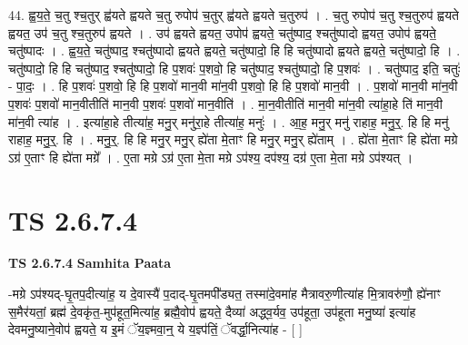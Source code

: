 \documentclass[17pt]{extarticle}
\begin{document}
44. ह्व॒य॒ते॒ च॒तु श्च॒तुर् ह्व॑यते ह्वयते च॒तु रुपोप॑ च॒तुर् ह्व॑यते ह्वयते च॒तुरुप॑ । . च॒तु रुपोप॑ च॒तु श्च॒तुरुप॑ ह्वयते ह्वयत॒ उप॑ च॒तु श्च॒तुरुप॑ ह्वयते । . उप॑ ह्वयते ह्वयत॒ उपोप॑ ह्वयते॒ चतु॑ष्पाद॒ श्चतु॑ष्पादो ह्वयत॒ उपोप॑ ह्वयते॒ चतु॑ष्पादः । . ह्व॒य॒ते॒ चतु॑ष्पाद॒ श्चतु॑ष्पादो ह्वयते ह्वयते॒ चतु॑ष्पादो॒ हि हि चतु॑ष्पादो ह्वयते ह्वयते॒ चतु॑ष्पादो॒ हि । . चतु॑ष्पादो॒ हि हि चतु॑ष्पाद॒ श्चतु॑ष्पादो॒ हि प॒शवः॑ प॒शवो॒ हि चतु॑ष्पाद॒ श्चतु॑ष्पादो॒ हि प॒शवः॑ । . चतु॑ष्पाद॒ इति॒ चतुः॑ - पा॒दः॒ । . हि प॒शवः॑ प॒शवो॒ हि हि प॒शवो॑ मान॒वी मा॑न॒वी प॒शवो॒ हि हि प॒शवो॑ मान॒वी । . प॒शवो॑ मान॒वी मा॑न॒वी प॒शवः॑ प॒शवो॑ मान॒वीतीति॑ मान॒वी प॒शवः॑ प॒शवो॑ मान॒वीति॑ । . मा॒न॒वीतीति॑ मान॒वी मा॑न॒वी त्या॑हा॒हे ति॑ मान॒वी मा॑न॒वी त्या॑ह । . इत्या॑हा॒हे तीत्या॑ह॒ मनु॒र् मनु॑रा॒हे तीत्या॑ह॒ मनुः॑ । . आ॒ह॒ मनु॒र् मनु॑ राहाह॒ मनु॒र्॒. हि हि मनु॑ राहाह॒ मनु॒र्॒. हि । . मनु॒र्॒. हि हि मनु॒र् मनु॒र् ह्ये॑ता मे॒ताꣳ हि मनु॒र् मनु॒र् ह्ये॑ताम् । . ह्ये॑ता मे॒ताꣳ हि ह्ये॑ता मग्रे ऽग्र॑ ए॒ताꣳ हि ह्ये॑ता मग्रे᳚ । . ए॒ता मग्रे ऽग्र॑ ए॒ता मे॒ता मग्रे ऽप॑श्य॒ दप॑श्य॒ दग्र॑ ए॒ता मे॒ता मग्रे ऽप॑श्यत् । \newline
\pagebreak
{}

\section{ TS 2.6.7.4 }

\textbf{TS 2.6.7.4 } \newline
\textbf{Samhita Paata} \newline

-मग्रे ऽप॑श्यद्-घृ॒तप॒दीत्या॑ह॒ य दे॒वास्यै॑ प॒दाद्-घृ॒तमपी᳚ड्यत॒ तस्मा॑दे॒वमा॑ह मैत्रावरु॒णीत्या॑ह मि॒त्रावरु॑णौ॒ ह्ये॑नाꣳ स॒मैर॑यतां॒ ब्रह्म॑ दे॒वकृ॑त॒-मुप॑हूत॒मित्या॑ह॒ ब्रह्मै॒वोप॑ ह्वयते॒ दैव्या॑ अद्ध्व॒र्यव॒ उप॑हूता॒ उप॑हूता मनु॒ष्या॑ इत्या॑ह देवमनु॒ष्याने॒वोप॑ ह्वयते॒ य इ॒मं ॅय॒ज्ञ्मवा॒न्॒ ये य॒ज्ञ्प॑तिं॒ ॅवर्द्धा॒नित्या॑ह - [  ] \newline
\end{document}
